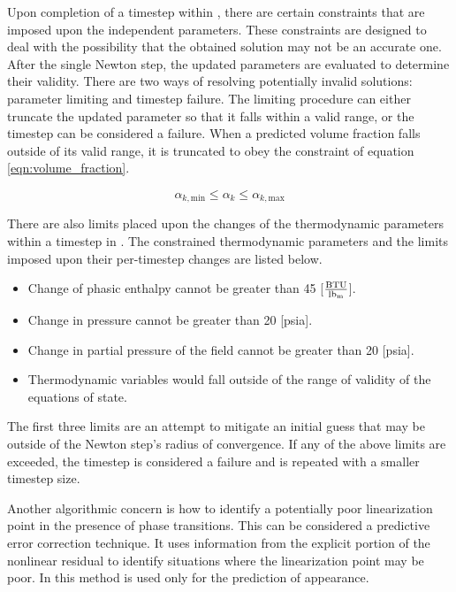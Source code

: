 Upon completion of a timestep within \cobra{}, there are certain constraints that are imposed upon the independent parameters.
These constraints are designed to deal with the possibility that the obtained solution may not be an accurate one.
After the single Newton step, the updated parameters are evaluated to determine their validity.
There are two ways of resolving potentially invalid solutions: parameter limiting and timestep failure.
The limiting procedure can either truncate the updated parameter so that it falls within a valid range, or the timestep can be considered a failure.
When a predicted volume fraction falls outside of its valid range, it is truncated to obey the constraint of equation \eqref{eqn:volume_fraction}.

\begin{equation}
\label{eqn:volume_fraction}
\alpha_{k,\text{min}} \leq \alpha_k \leq \alpha_{k,\text{max}} 
\end{equation}

There are also limits placed upon the changes of the thermodynamic parameters within a timestep in \cobra{}.
The constrained thermodynamic parameters and the limits imposed upon their per-timestep changes are listed below.

\begin{itemize}
\item{Change of phasic enthalpy cannot be greater than 45 [$\frac{\text{BTU}}{\lbm{}}$].}
\item{Change in pressure cannot be greater than 20 [psia].}
\item{Change in partial pressure of the \ncg{} field cannot be greater than 20 [psia].}
\item{Thermodynamic variables would fall outside of the range of validity of the equations of state.}
\end{itemize}

The first three limits are an attempt to mitigate an initial guess that may be outside of the Newton step's radius of convergence.
If any of the above limits are exceeded, the timestep is considered a failure and is repeated with a smaller timestep size.

Another algorithmic concern is how to identify a potentially poor linearization point in the presence of phase transitions. 
This can be considered a predictive error correction technique.
It uses information from the explicit portion of the nonlinear residual to identify situations where the linearization point may be poor.
In \cobra{} this method is used only for the prediction of \ncg{} appearance.

